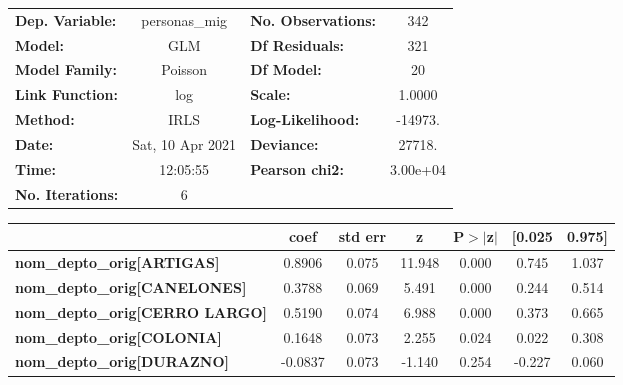 \begin{center}
\begin{tabular}{lclc}
\toprule
\textbf{Dep. Variable:}                   &  personas\_mig   & \textbf{  No. Observations:  } &      342    \\
\textbf{Model:}                           &       GLM        & \textbf{  Df Residuals:      } &      321    \\
\textbf{Model Family:}                    &     Poisson      & \textbf{  Df Model:          } &       20    \\
\textbf{Link Function:}                   &       log        & \textbf{  Scale:             } &    1.0000   \\
\textbf{Method:}                          &       IRLS       & \textbf{  Log-Likelihood:    } &   -14973.   \\
\textbf{Date:}                            & Sat, 10 Apr 2021 & \textbf{  Deviance:          } &    27718.   \\
\textbf{Time:}                            &     12:05:55     & \textbf{  Pearson chi2:      } &  3.00e+04   \\
\textbf{No. Iterations:}                  &        6         & \textbf{                     } &             \\
\bottomrule
\end{tabular}
\begin{tabular}{lcccccc}
                                          & \textbf{coef} & \textbf{std err} & \textbf{z} & \textbf{P$> |$z$|$} & \textbf{[0.025} & \textbf{0.975]}  \\
\midrule
\textbf{nom\_depto\_orig[ARTIGAS]}        &       0.8906  &        0.075     &    11.948  &         0.000        &        0.745    &        1.037     \\
\textbf{nom\_depto\_orig[CANELONES]}      &       0.3788  &        0.069     &     5.491  &         0.000        &        0.244    &        0.514     \\
\textbf{nom\_depto\_orig[CERRO LARGO]}    &       0.5190  &        0.074     &     6.988  &         0.000        &        0.373    &        0.665     \\
\textbf{nom\_depto\_orig[COLONIA]}        &       0.1648  &        0.073     &     2.255  &         0.024        &        0.022    &        0.308     \\
\textbf{nom\_depto\_orig[DURAZNO]}        &      -0.0837  &        0.073     &    -1.140  &         0.254        &       -0.227    &        0.060     \\

\end{tabular}
\end{center}
